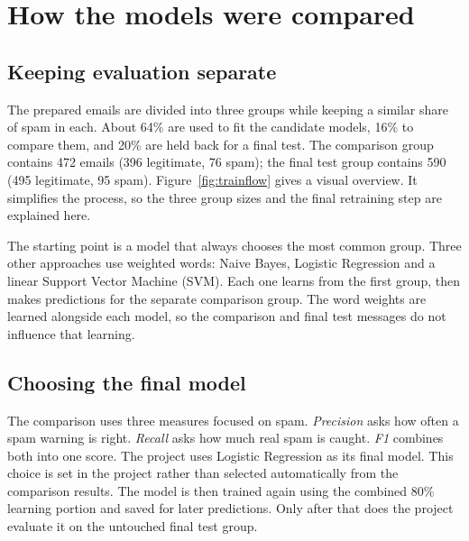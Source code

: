 \chapter{How the models were compared}
\section{Keeping evaluation separate}
The prepared emails are divided into three groups while keeping a similar share of spam in each. About 64\% are used to fit the candidate models, 16\% to compare them, and 20\% are held back for a final test. The comparison group contains 472 emails (396 legitimate, 76 spam); the final test group contains 590 (495 legitimate, 95 spam). Figure~\ref{fig:trainflow} gives a visual overview. It simplifies the process, so the three group sizes and the final retraining step are explained here.


The starting point is a model that always chooses the most common group. Three other approaches use weighted words: Naive Bayes, Logistic Regression and a linear Support Vector Machine (SVM). Each one learns from the first group, then makes predictions for the separate comparison group. The word weights are learned alongside each model, so the comparison and final test messages do not influence that learning\cite{pipeline}.

\section{Choosing the final model}
The comparison uses three measures focused on spam. \emph{Precision} asks how often a spam warning is right. \emph{Recall} asks how much real spam is caught. \emph{F1} combines both into one score. The project uses Logistic Regression as its final model. This choice is set in the project rather than selected automatically from the comparison results. The model is then trained again using the combined 80\% learning portion and saved for later predictions. Only after that does the project evaluate it on the untouched final test group.
